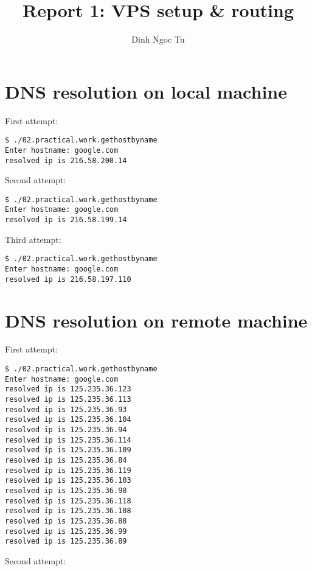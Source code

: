 \documentclass[12pt]{article}
\title{Report 1: VPS setup \& routing}
\author{Dinh Ngoc Tu}
\begin{document}
\maketitle


\section{DNS resolution on local machine}

First attempt:

\begin{lstlisting}[breaklines]
$ ./02.practical.work.gethostbyname
Enter hostname: google.com
resolved ip is 216.58.200.14
\end{lstlisting}

Second attempt:

\begin{lstlisting}[breaklines]
$ ./02.practical.work.gethostbyname
Enter hostname: google.com
resolved ip is 216.58.199.14
\end{lstlisting}

Third attempt:

\begin{lstlisting}[breaklines]
$ ./02.practical.work.gethostbyname
Enter hostname: google.com
resolved ip is 216.58.197.110
\end{lstlisting}


\section{DNS resolution on remote machine}

First attempt:

\begin{lstlisting}[breaklines]
$ ./02.practical.work.gethostbyname
Enter hostname: google.com
resolved ip is 125.235.36.123
resolved ip is 125.235.36.113
resolved ip is 125.235.36.93
resolved ip is 125.235.36.104
resolved ip is 125.235.36.94
resolved ip is 125.235.36.114
resolved ip is 125.235.36.109
resolved ip is 125.235.36.84
resolved ip is 125.235.36.119
resolved ip is 125.235.36.103
resolved ip is 125.235.36.98
resolved ip is 125.235.36.118
resolved ip is 125.235.36.108
resolved ip is 125.235.36.88
resolved ip is 125.235.36.99
resolved ip is 125.235.36.89
\end{lstlisting}

Second attempt:
\end{document}
